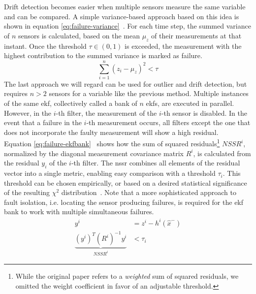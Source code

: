 Drift detection becomes easier when multiple sensors measure the same variable and can be compared. A simple variance-based approach based on this idea is shown in equation \ref{eq:failure-variance}~\cite[p.~20]{Kabzan.2019}. For each time step, the summed variance of $n$ sensors is calculated, based on the mean $\mu_z$ of their measurements at that instant. Once the threshold $\tau \in (0, 1)$ is exceeded, the measurement with the highest contribution to the summed variance is marked as failure.
\begin{equation}\label{eq:failure-variance}%
\sum_{i=1}^n (z_i - \mu_z)^2 < \tau%
\end{equation}
The last approach we will regard can be used for outlier and drift detection, but requires $n>2$ sensors for a variable like the previous method. Multiple instances of the same \gls{ekf}, collectively called a bank of $n$ \gls{ekf}s, are executed in parallel. However, in the $i$-th filter, the measurement of the $i$-th sensor is disabled. In the event that a failure in the $i$-th measurement occurs, all filters except the one that does not incorporate the faulty measurement will show a high residual. \\ Equation \ref{eq:failure-ekfbank}~\cite[p.~3]{Kobayashi.2003} shows how the sum of squared residuals\footnote{While the original paper refers to a \textit{weighted} sum of squared residuals, we omitted the weight coefficient in favor of an adjustable threshold.} $\textit{NSSR}^i$, normalized by the diagonal measurement covariance matrix $R^i$, is calculated from the residual $y_i$ of the $i$-th filter. The \gls{nssr} combines all elements of the residual vector into a single metric, enabling easy comparison with a threshold $\tau_i$. This threshold can be chosen empirically, or based on a desired statistical significance of the resulting $\chi^2$ distribution~\cite[p.~3]{Xue.2007}. Note that a more sophisticated approach to fault isolation, i.e. locating the sensor producing failures, is required for the \gls{ekf} bank to work with multiple simultaneous failures.
\begin{subequations}\label{eq:failure-ekfbank}
\begin{alignat}{2}%
y^i &= z^i - h^i(\hat{x}^-) \\%
\underbrace{(y^i)^T (R^i)^{-1} y^i}_\textrm{$\textit{NSSR}^i$} &< \tau_i%
\end{alignat}
\end{subequations}
